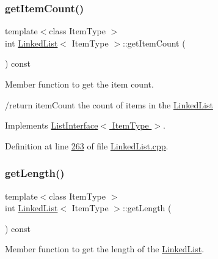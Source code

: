 \mbox{\label{classLinkedList_afc6635f854f48f2f126cf3b60d845220}} 
\subsubsection{\texorpdfstring{get\+Item\+Count()}{getItemCount()}}
{\footnotesize\ttfamily template$<$class Item\+Type $>$ \\
int \hyperlink{classLinkedList}{Linked\+List}$<$ Item\+Type $>$\+::get\+Item\+Count (\begin{DoxyParamCaption}{ }\end{DoxyParamCaption}) const\hspace{0.3cm}{\ttfamily [virtual]}}



Member function to get the item count. 

/return item\+Count the count of items in the \hyperlink{classLinkedList}{Linked\+List} 

Implements \hyperlink{classListInterface_a3e085e6ea9c5dc3e8007010cd889159c}{List\+Interface$<$ Item\+Type $>$}.



Definition at line \hyperlink{LinkedList_8cpp_source_l00263}{263} of file \hyperlink{LinkedList_8cpp_source}{Linked\+List.\+cpp}.

\mbox{\label{classLinkedList_a61d045ef6008b494a1a516ecc992c0e7}} 
\subsubsection{\texorpdfstring{get\+Length()}{getLength()}}
{\footnotesize\ttfamily template$<$class Item\+Type $>$ \\
int \hyperlink{classLinkedList}{Linked\+List}$<$ Item\+Type $>$\+::get\+Length (\begin{DoxyParamCaption}{ }\end{DoxyParamCaption}) const\hspace{0.3cm}{\ttfamily [virtual]}}



Member function to get the length of the \hyperlink{classLinkedList}{Linked\+List}. 

